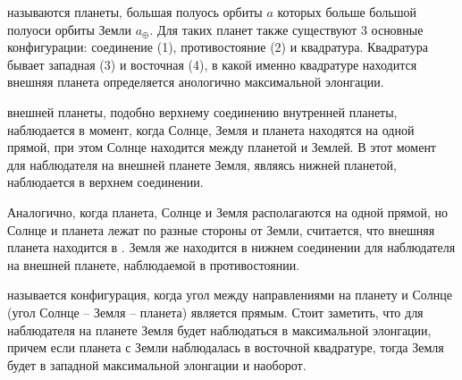  называются планеты, большая полуось орбиты $a$ 
которых больше большой полуоси орбиты Земли $a_\oplus$. Для таких планет также 
существуют 3 основные конфигурации: соединение (1), противостояние (2) и 
квадратура. Квадратура бывает западная (3) и восточная (4), в какой именно 
квадратуре находится внешняя планета определяется анологично максимальной 
элонгации.

 внешней планеты, подобно верхнему соединению внутренней 
планеты, наблюдается в момент, когда Солнце, Земля и планета находятся на одной 
прямой, при этом Солнце находится между планетой и Землей. В этот момент для 
наблюдателя на внешней планете Земля, являясь нижней планетой, наблюдается в 
верхнем соединении.

Аналогично, когда планета, Солнце и Земля располагаются на одной прямой, но 
Солнце и планета лежат по разные стороны от Земли, считается, что внешняя 
планета находится в . Земля же находится в нижнем 
соединении для наблюдателя на внешней планете, наблюдаемой в противостоянии.

 называется конфигурация, когда угол между направлениями 
на планету и Солнце (угол Солнце -- Земля -- планета) является прямым. Стоит 
заметить, что для наблюдателя на планете Земля будет наблюдаться в максимальной 
элонгации, причем если планета с Земли наблюдалась в восточной квадратуре, 
тогда Земля будет в западной максимальной элонгации и наоборот.
